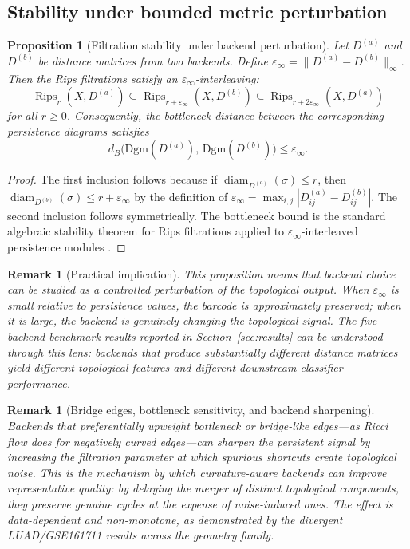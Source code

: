 \documentclass[11pt]{article}
\newtheorem{proposition}[theorem]{Proposition}
\newtheorem{remark}[theorem]{Remark}
\DeclareMathOperator{\Rips}{Rips}
\DeclareMathOperator{\diam}{diam}
\begin{document}
\subsection{Stability under bounded metric perturbation}

\begin{proposition}[Filtration stability under backend perturbation]\label{prop:stability}
Let $D^{(a)}$ and $D^{(b)}$ be distance matrices from two backends.
Define $\varepsilon_\infty = \|D^{(a)} - D^{(b)}\|_\infty$.
Then the Rips filtrations satisfy an $\varepsilon_\infty$-interleaving:
\[
\Rips_r(X, D^{(a)}) \subseteq \Rips_{r + \varepsilon_\infty}(X, D^{(b)}) \subseteq \Rips_{r + 2\varepsilon_\infty}(X, D^{(a)})
\]
for all $r \ge 0$.
Consequently, the bottleneck distance between the corresponding persistence diagrams satisfies
\[
d_B\bigl(\mathrm{Dgm}(D^{(a)}),\, \mathrm{Dgm}(D^{(b)})\bigr) \le \varepsilon_\infty.
\]
\end{proposition}

\begin{proof}
The first inclusion follows because if $\diam_{D^{(a)}}(\sigma) \le r$, then $\diam_{D^{(b)}}(\sigma) \le r + \varepsilon_\infty$ by the definition of $\varepsilon_\infty = \max_{i,j} |D^{(a)}_{ij} - D^{(b)}_{ij}|$.
The second inclusion follows symmetrically.
The bottleneck bound is the standard algebraic stability theorem for Rips filtrations applied to $\varepsilon_\infty$-interleaved persistence modules \cite{chazal2014persistence}.
\end{proof}

\begin{remark}[Practical implication]\label{rem:perturbation}
This proposition means that backend choice can be studied as a \emph{controlled perturbation} of the topological output.
When $\varepsilon_\infty$ is small relative to persistence values, the barcode is approximately preserved; when it is large, the backend is genuinely changing the topological signal.
The five-backend benchmark results reported in Section~\ref{sec:results} can be understood through this lens: backends that produce substantially different distance matrices yield different topological features and different downstream classifier performance.
\end{remark}

\begin{remark}[Bridge edges, bottleneck sensitivity, and backend sharpening]\label{rem:bridge}
Backends that preferentially upweight bottleneck or bridge-like edges---as Ricci flow does for negatively curved edges---can sharpen the persistent signal by increasing the filtration parameter at which spurious shortcuts create topological noise.
This is the mechanism by which curvature-aware backends can improve representative quality: by delaying the merger of distinct topological components, they preserve genuine cycles at the expense of noise-induced ones.
The effect is data-dependent and non-monotone, as demonstrated by the divergent LUAD/GSE161711 results across the geometry family.
\end{remark}
\end{document}
